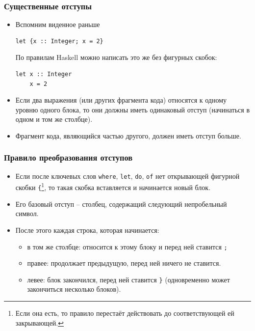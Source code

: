\documentclass[10pt]{beamer}
\begin{document}
\begin{frame}[fragile]
\frametitle{Существенные отступы}
\begin{itemize}
    \item Вспомним виденное раньше
\begin{lstlisting}
let {x :: Integer; x = 2}
\end{lstlisting}
По правилам Haskell можно написать это же без фигурных скобок:
\begin{lstlisting}
let x :: Integer
    x = 2
\end{lstlisting}
\item Если два выражения (или других фрагмента кода) относятся к одному уровню одного блока, то они должны иметь одинаковый отступ (начинаться в одном и том же столбце).
\item Фрагмент кода, являющийся частью другого, должен иметь отступ больше.
\end{itemize}
\end{frame}
\begin{frame}[fragile]
\frametitle{Правило преобразования отступов}
\begin{itemize}
\item Если после ключевых слов \lstinline|where|, \lstinline|let|, \lstinline|do|, \lstinline|of| нет открывающей фигурной скобки \lstinline|{|\footnote{Если она есть, то правило перестаёт действовать до соответствующей ей закрывающей.}, то такая скобка вставляется и начинается новый блок.
\item Его базовый отступ -- столбец, содержащий следующий непробельный символ. 
\item После этого каждая строка, которая начинается:
\begin{itemize}
    \item в том же столбце: относится к этому блоку и перед ней ставится \lstinline|;|
    \item правее: продолжает предыдущую, перед ней ничего не ставится.
    \item левее: блок закончился, перед ней ставится \lstinline|}| (одновременно может закончиться несколько блоков).
\end{itemize}
\end{itemize}
\end{frame}
\end{document}
